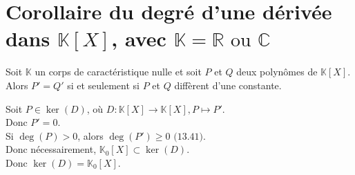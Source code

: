 \documentclass[../main.tex]{subfiles}
\begin{document}
\setcounter{section}{41}
\section{Corollaire du degré d'une dérivée dans $\mathbb{K}[X]$, avec $\mathbb{K} = \mathbb{R} \text{ ou } \mathbb{C}$}

\begin{tcolorbox}[title=Corollaire 13.42, title filled=false, colframe=orange, colback=orange!10!white]
    Soit $\mathbb{K}$ un corps de caractéristique nulle et soit $P$ et $Q$ deux polynômes de $\mathbb{K}[X]$. Alors $P' = Q'$ si et seulement si $P$ et $Q$ diffèrent d'une constante. 
\end{tcolorbox}

Soit $P \in \ker (D)$, où $D:\mathbb{K}[X] \to \mathbb{K}[X], P \mapsto P'$. \\
Donc $P' = 0$. \\
Si $\deg (P) > 0$, alors $\deg(P') \geq 0$ $\text{(13.41)}$. \\
Donc nécessairement, $\mathbb{K}_0[X] \subset \ker(D)$. \\
Donc $\ker(D) = \mathbb{K}_0[X]$. 
\end{document}

